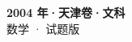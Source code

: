 \documentclass[zihao=-4, a4paper]{ctexart}
\begin{document}
\begin{center}
  {\Large\bfseries 2004 年·天津卷·文科}\\[4pt]
  {\large 数学 · 试题版}
\end{center}
\medskip
{}

\end{document}
